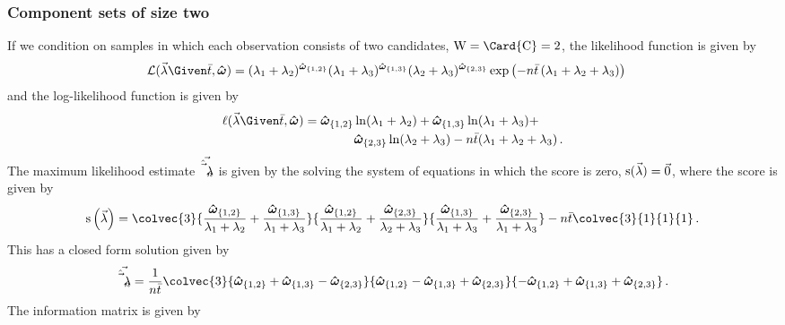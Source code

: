 \documentclass[../main.tex]{subfiles}
\begin{document}
\subsubsection{Component sets of size two}
If we condition on samples in which each observation consists of two 
candidates, $\RV{W} = \Card{\rvcand} = 2$, the likelihood function is 
given by
\begin{equation}
\begin{split}
    \likelihood(\vec\lambda \Given \bar{t}, \cntsymb) &= (\lambda_1 + \lambda_2)^{\cnt{1,2}} (\lambda_1 + \lambda_3)^{\cnt{1,3}} (\lambda_2 + \lambda_3)^{\cnt{2,3}} \exp\left(-n \bar{t} \left(\lambda_1 + \lambda_2 + \lambda_3\right)\right)
\end{split}
\end{equation}
and the log-likelihood function is given by
\begin{equation}
\begin{split}
    \ell(\vec\lambda \Given \bar{t}, \cntsymb) &= \cnt{1,2} \ln(\lambda_1 + \lambda_2) + \cnt{1,3} \ln(\lambda_1 + \lambda_3) + \\
        & \qquad \qquad \cnt{2,3} \ln(\lambda_2 + \lambda_3) - n \bar{t} (\lambda_1 + \lambda_2 + \lambda_3)\,.
\end{split}
\end{equation}
The maximum likelihood estimate $\vec{\hat{\vec\lambda}_n}$ is given by the solving the system of equations in which the score is zero, $\operatorname{\rm{s}}(\vec\lambda) = \vec{0}$, where the score is given by
\begin{equation}
\label{eq:score_expo}
    \score\left(\vec\lambda\right) = \colvec{3}
        {\frac{\cnt{1,2}}{\lambda_1 + \lambda_2} +  \frac{\cnt{1,3}}{\lambda_1 + \lambda_3}}
        {\frac{\cnt{1,2}}{\lambda_1 + \lambda_2} +  \frac{\cnt{2,3}}{\lambda_2 + \lambda_3}}
        {\frac{\cnt{1,3}}{\lambda_1 + \lambda_3} +  \frac{\cnt{2,3}}{\lambda_1 + \lambda_3}} -
        n \bar{t} \colvec{3}{1}{1}{1}\,.
\end{equation}
This has a closed form solution given by
\begin{equation}
    \expomle = \frac{1}{n \bar{t}} \colvec{3}
        {\cnt{1,2} + \cnt{1,3} - \cnt{2,3}}
        {\cnt{1,2} - \cnt{1,3} + \cnt{2,3}}
        {-\cnt{1,2} + \cnt{1,3} + \cnt{2,3}}\,.
\end{equation}
The information matrix is given by
\end{document}
